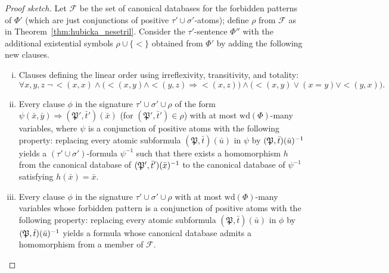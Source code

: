 \documentclass[oneside,reqno,12pt]{amsart}
\theoremstyle{plain}
\theoremstyle{remark}
\newcommand{\struct}[1]{\mathfrak{#1}}
\newcommand{\wh}{\ensuremath{\mathrm{wd}}\xspace}
\newcommand{\pre}[1]{#1\smash{^{-1}}}
\begin{document}
{\begin{proof}[Proof sketch]
Let $\mathcal{F}$ be the set of canonical databases for the forbidden patterns of $\Phi'$ (which are just conjunctions of positive $\tau'\cup \sigma'$-atoms); define $\rho$ from $\mathcal{F}$ as in Theorem~\ref{thm:hubicka_nesetril}.
Consider the $\tau'$-sentence $\Phi''$ with the additional existential symbols $\rho\cup \{<\}$  obtained from $\Phi'$ by adding the following new clauses.\begin{enumerate}[i.]
\item \label{item:clauses1} Clauses defining the linear order using irreflexivity, transitivity, and totality:
    \[
    \forall x,y,z\;   \neg\, {<}(x,x) \wedge  \big( {<}(x,y) \wedge {<}(y,z) \Rightarrow  {<}(x,z) \big) \wedge    \big( {<}(x,y) \vee (x=y) \vee  {<}(y,x) \big). \]
    \item \label{item:clauses2} Every clause $\phi$ in the signature $\tau'\cup \sigma' \cup \rho$ of the form $\psi(\bar{x},\bar{y})\Rightarrow (\struct{P}',\bar{t}')(\bar{x})$ (for $(\struct{P}',\bar{t}')\in \rho$) with at most $\wh(\Phi)$-many variables, where $\psi$ is a conjunction of positive atoms with the following property: 
replacing every atomic subformula $(\struct P ,\bar t)(\bar{u})$ in $\psi$ by $\pre{(\struct P ,\bar t)(\bar{u})}$ yields a $(\tau'\cup \sigma')$-formula $\psi^{-1}$ such that there exists a homomorphism $h$ from the canonical database of $\pre{(\struct{P}',\bar{t}')(\bar{x})}$ to the canonical database of $\psi^{-1}$ satisfying $h(\bar{x})=\bar{x}$.\item \label{item:clauses3} Every clause $\phi$ in the signature $\tau'\cup \sigma' \cup \rho$ with at most $\wh(\Phi)$-many variables whose forbidden pattern  is a conjunction of positive atoms with the following property: 
replacing every atomic subformula $(\struct P ,\bar t)(\bar{u})$ in $\phi$ by $\pre{(\struct P ,\bar t)(\bar{u})}$ yields a formula whose canonical database admits a homomorphism from a member of $\mathcal{F}$.
    \end{enumerate}


\end{proof}}
\end{document}
